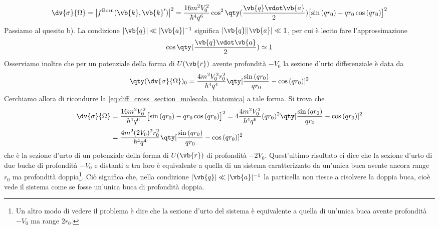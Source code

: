 \begin{soluzione}
   \begin{equation}
      \dv{\sigma}{\Omega}
      =\bigl| f^{\rm Born}(\vb{k},\vb{k}') \bigr|^2
      =\frac{16 m^2 V_0^2}{\hbar^4 q^6} \cos^2{ \qty( \frac{\vb{q} \vdot \vb{a}}{2} ) } \bigl[ \sin{(qr_0)} - qr_0\cos{(qr_0)} \bigr]^2
      \label{eq:diff_cross_section_molecola_biatomica}
   \end{equation}
   Passiamo al quesito b). La condizione $|\vb{q}| \ll |\vb{a}|^{-1}$ significa $|\vb{q}| |\vb{a}| \ll 1$, per cui è lecito fare l'approssimazione
   \begin{equation*}
      \cos{ \qty( \frac{\vb{q} \vdot \vb{a}}{2} ) } \simeq 1
   \end{equation*}
   Osserviamo inoltre che per un potenziale della forma di $U(\vb{r})$ avente profondità $-V_0$ la sezione d'urto differenziale è data da
   \begin{equation*}
      \qty( \dv{\sigma}{\Omega} )_0
      =\frac{4 m^2 V_0^2 r_0^2}{\hbar^4 q^4} \qty[ \frac{\sin{(qr_0)}}{qr_0} - \cos{(qr_0)} ]^2
   \end{equation*}
   Cerchiamo allora di ricondurre la \eqref{eq:diff_cross_section_molecola_biatomica} a tale forma. Si trova che
   \begin{equation*}
      \begin{split}
         \dv{\sigma}{\Omega}
         & =\frac{16 m^2 V_0^2}{\hbar^4 q^6} \bigl[ \sin{(qr_0)} - qr_0\cos{(qr_0)} \bigr]^2
           =4 \frac{4 m^2 V_0^2}{\hbar^4 q^6} (qr_0)^2 \qty[ \frac{\sin{(qr_0)}}{qr_0} - \cos{(qr_0)} ]^2
         \\[0.1cm]
         & =\frac{4 m^2 (2 V_0)^2 r_0^2}{\hbar^4 q^4} \qty[ \frac{\sin{(qr_0)}}{qr_0} - \cos{(qr_0)} ]^2
      \end{split}
   \end{equation*}
   che è la sezione d'urto di un potenziale della forma di $U(\vb{r})$ di profondità $-2V_0$. Quest'ultimo risultato ci dice che la sezione d'urto di due buche di profondità $-V_0$ e distanti $a$ tra loro è equivalente a quella di un sistema caratterizzato da un'unica buca avente ancora range $r_0$ ma profondità doppia\footnote{Un altro modo di vedere il problema è dire che la sezione d'urto del sistema è equivalente a quella di un'unica buca avente profondità $-V_0$ ma range $2r_0$.}. Ciò significa che, nella condizione $|\vb{q}| \ll |\vb{a}|^{-1}$ la particella non riesce a risolvere la doppia buca, cioè vede il sistema come se fosse un'unica buca di profondità doppia.
\end{soluzione}

\setcounter{equation}{0}